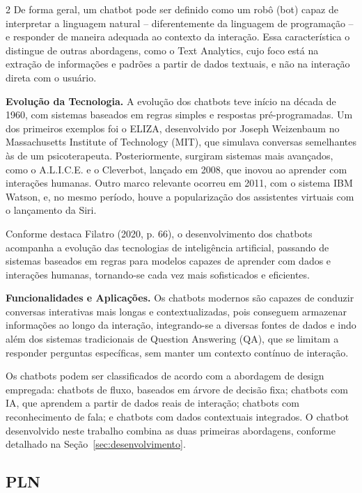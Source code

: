 \documentclass[10pt]{article}
\begin{document}
\begin{multicols}{2}
De forma geral, um chatbot pode ser definido como um robô (bot) capaz de
interpretar a linguagem natural -- diferentemente da linguagem de
programação -- e responder de maneira adequada ao contexto da interação.
Essa característica o distingue de outras abordagens, como o Text
Analytics, cujo foco está na extração de informações e padrões a partir
de dados textuais, e não na interação direta com o usuário.

\textbf{Evolução da Tecnologia.} A evolução dos chatbots teve início na
década de 1960, com sistemas baseados em regras simples e respostas
pré-programadas. Um dos primeiros exemplos foi o ELIZA, desenvolvido por
Joseph Weizenbaum no Massachusetts Institute of Technology (MIT), que
simulava conversas semelhantes às de um psicoterapeuta. Posteriormente,
surgiram sistemas mais avançados, como o A.L.I.C.E. e o Cleverbot,
lançado em 2008, que inovou ao aprender com interações humanas. Outro
marco relevante ocorreu em 2011, com o sistema IBM Watson, e, no mesmo
período, houve a popularização dos assistentes virtuais com o lançamento
da Siri.

Conforme destaca Filatro (2020, p. 66), o desenvolvimento dos chatbots
acompanha a evolução das tecnologias de inteligência artificial, passando
de sistemas baseados em regras para modelos capazes de aprender com dados
e interações humanas, tornando-se cada vez mais sofisticados e
eficientes.

\textbf{Funcionalidades e Aplicações.} Os chatbots modernos são capazes de
conduzir conversas interativas mais longas e contextualizadas, pois
conseguem armazenar informações ao longo da interação, integrando-se a
diversas fontes de dados e indo além dos sistemas tradicionais de
Question Answering (QA), que se limitam a responder perguntas
específicas, sem manter um contexto contínuo de interação.

Os chatbots podem ser classificados de acordo com a abordagem de design
empregada: chatbots de fluxo, baseados em árvore de decisão fixa;
chatbots com IA, que aprendem a partir de dados reais de interação;
chatbots com reconhecimento de fala; e chatbots com dados contextuais
integrados. O chatbot desenvolvido neste trabalho combina as duas
primeiras abordagens, conforme detalhado na Seção~\ref{sec:desenvolvimento}.

\subsection{PLN}\label{sec:pln}


\end{multicols}
\end{document}

